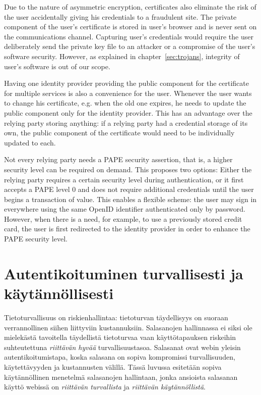 \documentclass[english,gradu]{tktltiki}
\begin{document}
    Due to the nature of asymmetric encryption, certificates also eliminate the risk of the user accidentally giving his credentials to a fraudulent site. The private component of the user's certificate is stored in user's browser and is never sent on the communications channel. Capturing user's credentials would require the user deliberately send the private key file to an attacker or a compromise of the user's software security. However, as explained in chapter~\ref{sec:trojans}, integrity of user's software is out of our scope.

      Having one identity provider providing the public component for the certificate for multiple services is also a convenience for the user. Whenever the user wants to change his certificate, e.g. when the old one expires, he needs to update the public component only for the identity provider. This has an advantage over the relying party storing anything: if a relying party had a credential storage of its own, the public component of the certificate would need to be individually updated to each.

      Not every relying party needs a PAPE security assertion, that is, a higher security level can be required on demand. This proposes two options: Either the relying party requires a certain security level during authentication, or it first accepts a PAPE level 0 and does not require additional credentials until the user begins a transaction of value. This enables a flexible scheme: the user may sign in everywhere using the same OpenID identifier authenticated only by password. However, when there is a need, for example, to use a previously stored credit card, the user is first redirected to the identity provider in order to enhance the PAPE security level.



\section{Autentikoituminen turvallisesti ja käytännöllisesti} %
\label{sec:autentikoituminen_turvallisesti_ja_käytännöllisesti}

Tietoturvallisuus on riskienhallintaa: tietoturvan täydellisyys on suoraan verrannollinen siihen liittyviin kustannuksiin. Salasanojen hallinnassa ei siksi ole mielekästä tavoitella täydellistä tietoturvaa vaan käyttötapauksen riskeihin suhteutettuna \emph{riittävän hyvää} turvallisuustasoa. Salasanat ovat webin yleisin autentikoitumistapa, koska salasana on sopiva kompromissi turvallisuuden, käytettävyyden ja kustannusten välillä. Tässä luvussa esitetään sopiva käytännöllinen menetelmä salasanojen hallintaan, jonka ansioista salasanan käyttö webissä on \emph{riittävän turvallista} ja \emph{riittävän käytännöllistä}.
\end{document}
